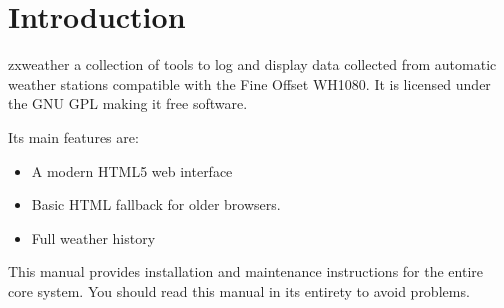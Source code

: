 \documentclass[a4paper,10pt,draft]{book}
\newcommand{\partnumber}{\ifthenelse{\isundefined{\projectnum}}{}{\projectnum-\docnum	\ifthenelse{\equal{\docrev}{001}}{}{.\docrev}}}
\begin{document}

\ifthenelse{\isundefined{\ordernumber}}{

\title{\doctitle{} - \docsubtitle}
\author{\docauthor}
}{

\title{\doctitle}
\subtitle{\docsubtitle}
\titleabstract{\docabstract}
\ordernumber{\partnumber}
\updateinfo{\docupdateinfo}
\osinfo{\docosver}
\swversion{\docswver}
\titlecopyright{\doccopyright}
\licensestatement{\doclicense}
}
\date{\docdate}

\maketitle

\clearpage

\tableofcontents
\clearpage



\chapter{Introduction}
\setcounter{page}{1}

zxweather a collection of tools to log and display data collected from automatic weather stations compatible with the Fine Offset WH1080. It is licensed under the GNU GPL making it free software.

Its main features are:
\begin{itemize}
\item A modern HTML5 web interface
\item Basic HTML fallback for older browsers.
\item Full weather history
\end{itemize}

This manual provides installation and maintenance instructions for the entire core system. You should read this manual in its entirety to avoid problems.
\end{document}
